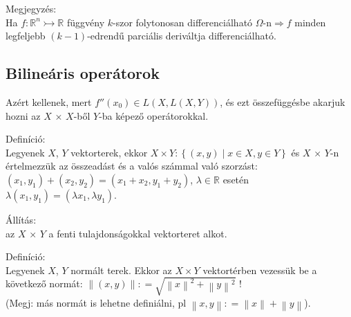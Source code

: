 \documentclass[12pt,a4paper]{scrartcl}
\newenvironment{definicio}{}{}
\newenvironment{allitas}{}{}
\newenvironment{megjegyzes}{}{}
\begin{document}
\begin{megjegyzes}

Megjegyzés:\\
Ha \(\left. f:{\mathbb{R}}^{n}\rightarrowtail{\mathbb{R}} \right.\)
függvény \(k\)-szor folytonosan differenciálható
\(\left. \Omega\text{-n}\Rightarrow f \right.\) minden legfeljebb
\(\left( {k - 1} \right)\)-edrendű parciális deriváltja
differenciálható.

\end{megjegyzes}

\hypertarget{bilinearis-operatorok}{%
\subsection{Bilineáris operátorok}\label{bilinearis-operatorok}}

Azért kellenek, mert
\(f''\left( x_{0} \right) \in L\left( {X,L\left( {X,Y} \right)} \right)\),
és ezt összefüggésbe akarjuk hozni az \(X\) × \(X\)-ből \(Y\)-ba képező
operátorokkal.

\begin{definicio}

Definíció:\\
Legyenek \(X\), \(Y\) vektorterek, ekkor
\(X \times Y:\left\{ \left( {x,y} \right) \middle| x \in X,y \in Y \right\}\)
és \(X\) × \(Y\)-n értelmezzük az összeadást és a valós számmal való
szorzást:
\(\left( {x_{1},y_{1}} \right) + \left( {x_{2},y_{2}} \right) = \left( {x_{1} + x_{2},y_{1} + y_{2}} \right)\),
\(\lambda \in {\mathbb{R}}\) esetén
\(\lambda\left( {x_{1},y_{1}} \right) = \left( {\lambda x_{1},\lambda y_{1}} \right)\).

\end{definicio}

\begin{allitas}

Állítás:\\
az \(X\) × \(Y\) a fenti tulajdonságokkal vektorteret alkot.

\end{allitas}

\begin{definicio}

Definíció:\\
Legyenek \(X\), \(Y\) normált terek. Ekkor az \(X \times Y\)
vektortérben vezessük be a következő normát:
\(\left\| \left( {x,y} \right) \right\|: = \sqrt{\left\| x \right\|^{2} + \left\| y \right\|^{2}}\)
!\\
(Megj: más normát is lehetne definiálni, pl
\(\left\| {x,y} \right\|: = \left\| x \right\| + \left\| y \right\|\)).

\end{definicio}
\end{document}

